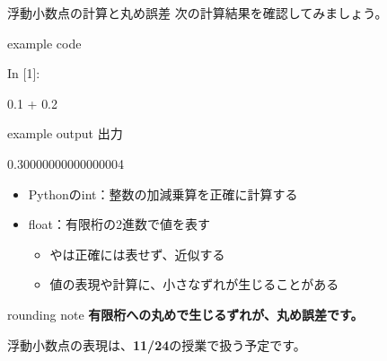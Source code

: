 \documentclass[12pt,aspectratio=43]{beamer}
\newcommand{\pythonresult}[3]{%
  \begin{beamercolorbox}[wd=\linewidth,sep=1.8mm]{example code}
    {\codefont\fontsize{9}{10}\selectfont\textcolor{courseblue}{In [#1]:}\par}
    {\codefont\fontsize{16}{18}\selectfont\strut#2\par}
  \end{beamercolorbox}\par
  \begin{beamercolorbox}[wd=\linewidth,sep=.5mm,leftskip=1.3mm]{example output}
    {\fontsize{9}{11}\selectfont\textcolor{black!65}{出力}}\quad
    {\codefont\fontsize{16}{18}\selectfont\strut#3}
  \end{beamercolorbox}}
\begin{document}
\begin{frame}[t]{浮動小数点の計算と丸め誤差}
  \setlength{\parskip}{0pt}
  次の計算結果を確認してみましょう。
  \par\vspace{1mm}
  \pythonresult{1}
    {\textcolor{codevalue}{0.1} + \textcolor{codevalue}{0.2}}
    {0.30000000000000004}
  \par\vspace{1mm}
  \begin{itemize}
    \setlength{\itemsep}{2mm}
    \item Pythonの{\codefont int}：整数の加減乗算を正確に計算する
    \item {\codefont float}：有限桁の2進数で値を表す
      \begin{itemize}
        \item {}や{}は正確には表せず、近似する
        \item 値の表現や計算に、小さなずれが生じることがある
      \end{itemize}
  \end{itemize}
  \vspace{1mm}
  \begin{beamercolorbox}[wd=\textwidth,sep=1.5mm]{rounding note}
    \textbf{有限桁への丸めで生じるずれが、丸め誤差です。}
  \end{beamercolorbox}
  \par\vspace{1mm}
  {\small 浮動小数点の表現は、\textcolor{courseblue}{\textbf{11/24}}の授業で扱う予定です。\par}
\end{frame}
\end{document}
